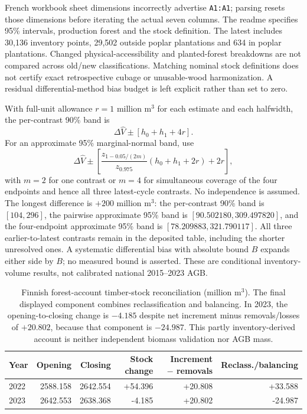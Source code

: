 French workbook sheet dimensions incorrectly advertise \texttt{A1:A1}; parsing resets those dimensions before iterating the actual seven columns. The readme specifies 95\% intervals, production forest and the stock definition. The latest includes 30,136 inventory points, 29,502 outside poplar plantations and 634 in poplar plantations. Changed physical-accessibility and planted-forest breakdowns are not compared across old/new classifications. Matching nominal stock definitions does not certify exact retrospective cubage or unusable-wood harmonization. A residual differential-method bias budget is left explicit rather than set to zero.

With full-unit allowance $r=1$ million m$^3$ for each estimate and each halfwidth, the per-contrast 90\% band is
\[
\Delta\widehat V\pm[h_0+h_1+4r].
\]
For an approximate 95\% marginal-normal band, use
\[
\Delta\widehat V\pm\left[\frac{z_{1-0.05/(2m)}}{z_{0.975}}(h_0+h_1+2r)+2r\right],
\]
with $m=2$ for one contrast or $m=4$ for simultaneous coverage of the four endpoints and hence all three latest-cycle contrasts. No independence is assumed. The longest difference is $+200$ million m$^3$: the per-contrast 90\% band is $[104,296]$, the pairwise approximate 95\% band is $[90.502180,309.497820]$, and the four-endpoint approximate 95\% band is $[78.209883,321.790117]$. All three earlier-to-latest contrasts remain in the deposited table, including the shorter unresolved ones. A systematic differential bias with absolute bound $B$ expands either side by $B$; no measured bound is asserted. These are conditional inventory-volume results, not calibrated national 2015--2023 AGB.

\begin{table}[htbp]
\centering\small
\caption{Finnish forest-account timber-stock reconciliation (million m$^3$). The final displayed component combines reclassification and balancing. In 2023, the opening-to-closing change is $-4.185$ despite net increment minus removals/losses of $+20.802$, because that component is $-24.987$. This partly inventory-derived account is neither independent biomass validation nor AGB mass.}\label{tab:SI_FIN_stock_flow}
\begin{tabularx}{\textwidth}{lrrrrr}\toprule
Year & Opening & Closing & Stock change & Increment $-$ removals & Reclass./balancing\\\midrule
2022 & 2588.158 & 2642.554 & +54.396 & +20.808 & +33.588\\
2023 & 2642.553 & 2638.368 & -4.185 & +20.802 & -24.987\\
\bottomrule\end{tabularx}
\end{table}

